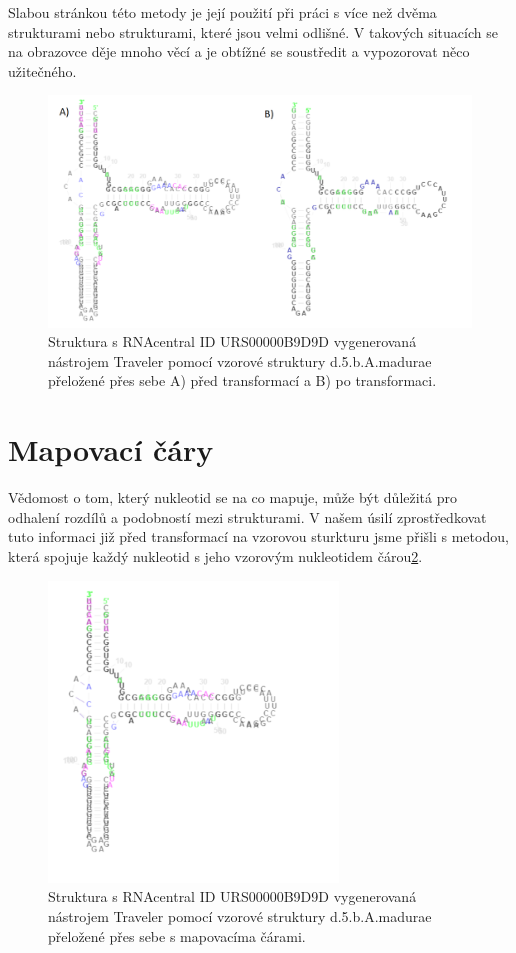Slabou stránkou této metody je její použití při práci s více než dvěma
strukturami nebo strukturami, které jsou velmi odlišné. V takových situacích se
na obrazovce děje mnoho věcí a je obtížné se soustředit a vypozorovat něco
užitečného.

\begin{figure}[H]
  \centering
  \includegraphics[width=140mm]{../img/kap02/animation.png}
  \caption[Před a po transformaci vygenerované struktury na vzorovou]{Struktura
  s RNAcentral ID URS00000B9D9D vygenerovaná nástrojem Traveler pomocí vzorové
  struktury d.5.b.A.madurae přeložené přes sebe A) před transformací a B) po
  transformaci.}
  \label{transformation}
\end{figure}

\section{Mapovací čáry}

Vědomost o tom, který nukleotid se na co mapuje, může být důležitá pro odhalení
rozdílů a podobností mezi strukturami. V našem úsilí zprostředkovat tuto
informaci již před transformací na vzorovou sturkturu jsme přišli s metodou,
která spojuje každý nukleotid s jeho vzorovým nukleotidem čárou\ref{lines}.

\begin{figure}[H]
  \centering
  \includegraphics[height=80mm]{../img/kap02/mappingLines/small.png}
  \caption[Ukázka mapovacích čar]{Struktura s RNAcentral ID URS00000B9D9D
  vygenerovaná nástrojem Traveler pomocí vzorové struktury d.5.b.A.madurae
  přeložené přes sebe s mapovacíma čárami.}
  \label{lines}
\end{figure}

